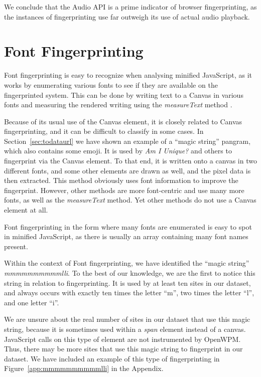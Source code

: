 \documentclass[
    fontsize=12pt,
    headings=small,
    parskip=half,
    bibliography=totoc,
    numbers=noenddot,
    open=any
    ]{scrreprt}
\begin{document}
We conclude that the Audio API is a prime indicator of browser fingerprinting, as the instances of
fingerprinting use far outweigh its use of actual audio playback.


\section{Font Fingerprinting}
\label{sec:font_fingerprinting}
Font fingerprinting is easy to recognize when analysing minified JavaScript,
as it works by enumerating various fonts to see if they are available on the fingerprinted
system. This can be done by writing text to a Canvas in various fonts and measuring
the rendered writing using the \textit{measureText} method \cite{englehardt2016census}.

Because of its usual use of the Canvas element, it is closely related to Canvas fingerprinting,
and it can be difficult to classify in some cases. In Section~\ref{sec:todataurl}
we have shown an example of a ``magic string'' pangram, which also contains some emoji.
It is used by \textit{Am I Unique?} and others to fingerprint via the Canvas element.
To that end, it is written onto a canvas in two different fonts, and some other elements are drawn
as well, and the pixel data is then extracted. This method obviously uses font information
to improve the fingerprint.
However, other methods are more font-centric and use many more fonts, as well as the \textit{measureText}
method.
Yet other methods do not use a Canvas element at all.

Font fingerprinting in the form where many fonts are enumerated is easy to spot in minified JavaScript,
as there is usually an array containing many font names present.

Within the context of Font fingerprinting, we have identified the ``magic string''
\textit{mmmmmmmmmmlli}. To the best of our knowledge, we are the first to notice this string
in relation to fingerprinting. It is used by at least ten sites in our dataset, and always occurs
with exactly ten times the letter ``m'', two times the letter ``l'', and one letter ``i''.

We are unsure about the real number of sites in our dataset that use this magic string, because
it is sometimes used within a \textit{span} element instead of a canvas.
JavaScript calls on this type of element are not instrumented by OpenWPM.
Thus, there may be more sites that use this magic string to fingerprint
in our dataset.
We have included an example of this type of fingerprinting in Figure~\ref{app:mmmmmmmmmmlli}
in the Appendix.
\end{document}
